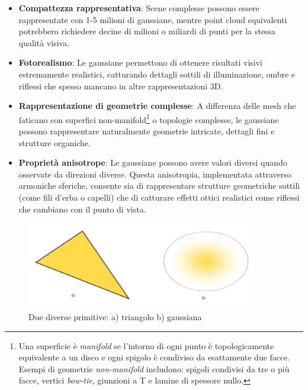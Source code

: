 \begin{itemize}
    \item \textbf{Compattezza rappresentativa}: Scene complesse possono essere rappresentate con 1-5 milioni di gaussiane, mentre point cloud equivalenti potrebbero richiedere decine di milioni o miliardi di punti per la stessa qualità visiva.

    \item \textbf{Fotorealismo}: Le gaussiane permettono di ottenere risultati visivi estremamente realistici, catturando dettagli sottili di illuminazione, ombre e riflessi che spesso mancano in altre rappresentazioni 3D.
    
    \item \textbf{Rappresentazione di geometrie complesse}: A differenza delle mesh che faticano con superfici non-manifold\footnote{Una superficie è \emph{manifold} se l'intorno di ogni punto è topologicamente equivalente a un disco e ogni spigolo è condiviso da esattamente due facce. Esempi di geometrie \emph{non-manifold} includono: spigoli condivisi da tre o più facce, vertici \emph{bow-tie}, giunzioni a T e lamine di spessore nullo.} o topologie complesse, le gaussiane possono rappresentare naturalmente geometrie intricate, dettagli fini e strutture organiche.
    
    \item \textbf{Proprietà anisotrope}: Le gaussiane possono avere valori diversi quando osservate da direzioni diverse. Questa anisotropia, implementata attraverso armoniche sferiche, consente sia di rappresentare strutture geometriche sottili (come fili d'erba o capelli) che di catturare effetti ottici realistici come riflessi che cambiano con il punto di vista.
\end{itemize}
\begin{figure}[htbp]
    \centering
    \includegraphics[width=0.9\textwidth]{images/gaussiana_vs_triangle.jpg}
    \caption{Due diverse primitive: a) triangolo b) gaussiana}
    \label{fig:gaussian_and_triangle_mesh}
\end{figure}


